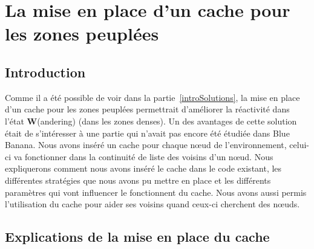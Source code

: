 \section{La mise en place d'un cache pour les zones peuplées}
\subsection{Introduction}
Comme il a été possible de voir dans la partie~\ref{introSolutions}, la mise en place d'un cache pour les zones peuplées permettrait d'améliorer la réactivité dans l'état \textbf{W}(andering) (dans les zones denses). Un des avantages de cette solution était de s'intéresser à une partie qui n'avait pas encore été étudiée dans Blue Banana. Nous avons inséré un cache pour chaque nœud de l'environnement, celui-ci va fonctionner dans la continuité de liste des voisins d'un nœud. Nous expliquerons comment nous avons inséré le cache dans le code existant, les différentes stratégies que nous avons pu mettre en place et les différents paramètres qui vont influencer le fonctionnent du cache. Nous avons aussi permis l'utilisation du cache pour aider ses voisins quand ceux-ci cherchent des nœuds.
 
\subsection{Explications de la mise en place du cache}

